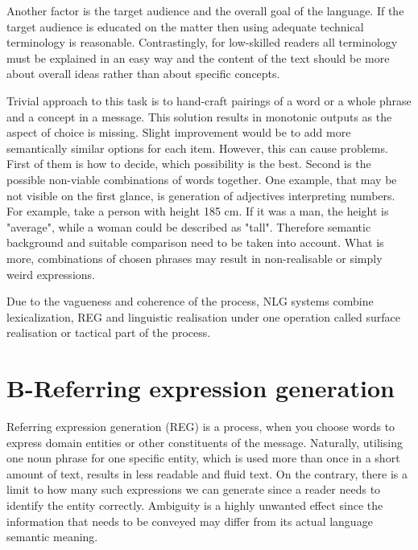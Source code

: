 Another factor is the target audience and the overall goal of the language. If the target audience is educated on the matter then using adequate technical terminology is reasonable. Contrastingly, for low-skilled readers all terminology must be explained in an easy way and the content of the text should be more about overall ideas rather than about specific concepts. 

Trivial approach to this task is to hand-craft pairings of a word or a whole phrase and a concept in a message. This solution results in monotonic outputs as the aspect of choice is missing. Slight improvement would be to add more semantically similar options for each item. However, this can cause problems. First of them is how to decide, which possibility is the best. Second is the possible non-viable combinations of words together. One example, that may be not visible on the first glance, is generation of adjectives interpreting numbers. For example, take a person with height 185 cm. If it was a man, the height is "average", while a woman could be described as "tall". Therefore semantic background and suitable comparison need to be taken into account. What is more, combinations of chosen phrases may result in non-realisable or simply weird expressions. 

Due to the vagueness and coherence of the process, NLG systems combine lexicalization, REG and linguistic realisation under one operation called surface realisation or tactical part of the process.  

\section{B-Referring expression generation}
Referring expression generation (REG) is a process, when you choose words to express domain entities or other constituents of the message. Naturally, utilising one noun phrase for one specific entity, which is used more than once in a short amount of text, results in less readable and fluid text. On the contrary, there is a limit to how many such expressions we can generate since a reader needs to identify the entity correctly. Ambiguity is a highly unwanted effect since the information that needs to be conveyed may differ from its actual language semantic meaning.

